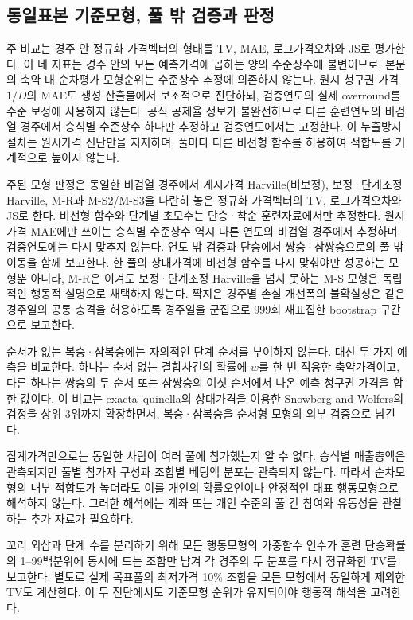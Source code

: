 \subsection{동일표본 기준모형, 풀 밖 검증과 판정}

주 비교는 경주 안 정규화 가격벡터의 형태를 TV, MAE, 로그가격오차와 JS로
평가한다. 이 네 지표는 경주 안의 모든 예측가격에 곱하는 양의 수준상수에
불변이므로, 본문의 축약 대 순차평가 모형순위는 수준상수 추정에 의존하지 않는다.
원시 청구권 가격 $1/D$의 MAE도 생성 산출물에서 보조적으로 진단하되, 검증연도의
실제 overround를 수준 보정에 사용하지 않는다. 공식 공제율 정보가 불완전하므로
다른 훈련연도의 비검열 경주에서 승식별 수준상수 하나만 추정하고 검증연도에서는
고정한다. 이 누출방지 절차는 원시가격 진단만을 지지하며, 풀마다 다른 비선형
함수를 허용하여 적합도를 기계적으로 높이지 않는다.

주된 모형 판정은 동일한 비검열 경주에서 게시가격 Harville(비보정),
보정·단계조정 Harville,
M-R과 M-S2/M-S3을 나란히 놓은 정규화 가격벡터의 TV, 로그가격오차와 JS로
한다. 비선형 함수와 단계별 초모수는 단승·착순 훈련자료에서만 추정한다.
원시가격 MAE에만 쓰이는 승식별 수준상수 역시 다른 연도의 비검열 경주에서
추정하며 검증연도에는 다시 맞추지 않는다.
연도 밖 검증과 단승에서 쌍승·삼쌍승으로의 풀 밖 이동을 함께 보고한다. 한 풀의
상대가격에 비선형 함수를 다시 맞춰야만 성공하는 모형뿐 아니라, M-R은 이겨도
보정·단계조정 Harville을 넘지 못하는 M-S 모형은 독립적인 행동적 설명으로 채택하지
않는다. 짝지은 경주별 손실 개선폭의 불확실성은 같은 경주일의 공통
충격을 허용하도록 경주일을 군집으로 999회 재표집한 bootstrap 구간으로
보고한다.

순서가 없는 복승·삼복승에는 자의적인 단계 순서를 부여하지 않는다. 대신
두 가지 예측을 비교한다. 하나는 순서 없는 결합사건의 확률에 $w$를 한 번
적용한 축약가격이고, 다른 하나는 쌍승의 두 순서 또는 삼쌍승의 여섯 순서에서
나온 예측 청구권 가격을 합한 값이다. 이 비교는 exacta--quinella의 상대가격을
이용한 Snowberg and Wolfers의 검정을 상위 3위까지 확장하면서, 복승·삼복승을
순서형 모형의 외부 검증으로 남긴다.

집계가격만으로는 동일한 사람이 여러 풀에 참가했는지 알 수 없다. 승식별
매출총액은 관측되지만 풀별 참가자 구성과 조합별 베팅액 분포는 관측되지 않는다.
따라서 순차모형의 내부 적합도가 높더라도 이를
개인의 확률오인이나 안정적인 대표 행동모형으로 해석하지 않는다. 그러한 해석에는
계좌 또는 개인 수준의 풀 간 참여와 유동성을 관찰하는 추가 자료가 필요하다.

꼬리 외삽과 단계 수를 분리하기 위해 모든 행동모형의 가중함수 인수가 훈련
단승확률의 1--99백분위에 동시에 드는 조합만 남겨 각 경주의 두 분포를 다시
정규화한 TV를 보고한다. 별도로 실제 목표풀의 최저가격 10\% 조합을 모든
모형에서 동일하게 제외한 TV도 계산한다. 이 두 진단에서도 기준모형 순위가
유지되어야 행동적 해석을 고려한다.
